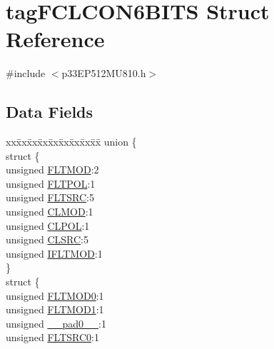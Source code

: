 \hypertarget{structtag_f_c_l_c_o_n6_b_i_t_s}{}\section{tag\+F\+C\+L\+C\+O\+N6\+B\+I\+TS Struct Reference}
\label{structtag_f_c_l_c_o_n6_b_i_t_s}


{\ttfamily \#include $<$p33\+E\+P512\+M\+U810.\+h$>$}

\subsection*{Data Fields}
\begin{DoxyCompactItemize}
\item 
\begin{tabbing}
xx\=xx\=xx\=xx\=xx\=xx\=xx\=xx\=xx\=\kill
union \{\\
\>struct \{\\
\>\>unsigned \hyperlink{structtag_f_c_l_c_o_n6_b_i_t_s_af8b7a5d667b31f1b0185c35ff963fc67}{FLTMOD}:2\\
\>\>unsigned \hyperlink{structtag_f_c_l_c_o_n6_b_i_t_s_acc9b95c2c3d735179abf0bb2304d00aa}{FLTPOL}:1\\
\>\>unsigned \hyperlink{structtag_f_c_l_c_o_n6_b_i_t_s_a5a279b9076b9774eeddf447ae606182a}{FLTSRC}:5\\
\>\>unsigned \hyperlink{structtag_f_c_l_c_o_n6_b_i_t_s_a9e490f0d4e5c9492ed27b0835fd4baa1}{CLMOD}:1\\
\>\>unsigned \hyperlink{structtag_f_c_l_c_o_n6_b_i_t_s_aa4163df728ce542fa3662a31fed0dab0}{CLPOL}:1\\
\>\>unsigned \hyperlink{structtag_f_c_l_c_o_n6_b_i_t_s_a55ab508cbc7a5023f1962f743a92a56b}{CLSRC}:5\\
\>\>unsigned \hyperlink{structtag_f_c_l_c_o_n6_b_i_t_s_a4573eed251d96a98a6b5ba1c7cc30451}{IFLTMOD}:1\\
\>\} \\
\>struct \{\\
\>\>unsigned \hyperlink{structtag_f_c_l_c_o_n6_b_i_t_s_acd6a08a1920b6cc12c170cbd6a61247d}{FLTMOD0}:1\\
\>\>unsigned \hyperlink{structtag_f_c_l_c_o_n6_b_i_t_s_accd970bed6a20d6ed7d5a8bb0a9329a3}{FLTMOD1}:1\\
\>\>unsigned \hyperlink{structtag_f_c_l_c_o_n6_b_i_t_s_adf71f3d8410c1f1dbbc96680a92c49af}{\_\_pad0\_\_}:1\\
\>\>unsigned \hyperlink{structtag_f_c_l_c_o_n6_b_i_t_s_ab130e70dc1cfc857cc586e187458c5ea}{FLTSRC0}:1\\

\end{tabbing}
\end{DoxyCompactItemize}

